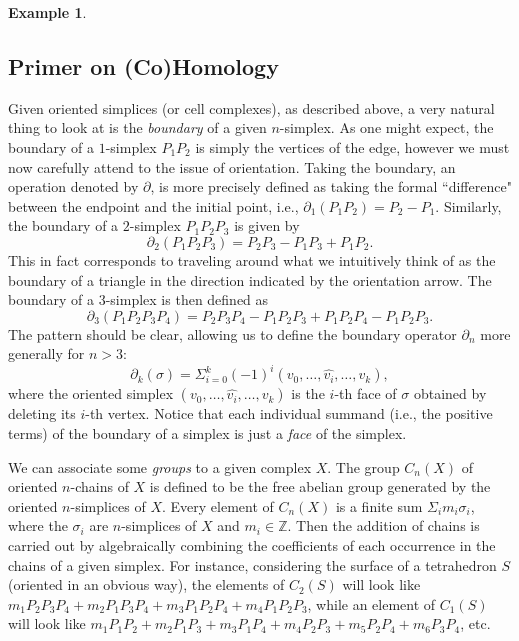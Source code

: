 \documentclass[a4paper]{book}
\theoremstyle{definition}
\newtheorem{example}{Example}[section]
\theoremstyle{definition}
\theoremstyle{definition}
\theoremstyle{theorem}
\theoremstyle{definition}
\begin{document}
\begin{example}
	\subsection{Primer on (Co)Homology}
	Given oriented simplices (or cell complexes), as described above, a very natural thing to look at is the \textit{boundary} of a given $n$-simplex. As one might expect, the boundary of a $1$-simplex $P_1P_2$ is simply the vertices of the edge, however we must now carefully attend to the issue of orientation. Taking the boundary, an operation denoted by $\partial$, is more precisely defined as taking the formal ``difference" between the endpoint and the initial point, i.e., $\partial_1(P_1P_2) = P_2 - P_1$. Similarly, the boundary of a $2$-simplex $P_1P_2P_3$ is given by 
	\begin{equation*}
	\partial_2(P_1P_2P_3) = P_2P_3 - P_1P_3 + P_1P_2.
	\end{equation*} 
	This in fact corresponds to traveling around what we intuitively think of as the boundary of a triangle in the direction indicated by the orientation arrow. The boundary of a $3$-simplex is then defined as 
	\begin{equation*}
	\partial_3(P_1P_2P_3P_4) = P_2P_3P_4 - P_1P_2P_3 + P_1P_2P_4 - P_1P_2P_3.
	\end{equation*}
	The pattern should be clear, allowing us to define the boundary operator $\partial_n$ more generally for $n > 3$: 
	\begin{equation}
	\partial_k(\sigma) = \Sigma_{i = 0}^k (-1)^i (v_0,\dots,\widehat{v_i},\dots,v_k), 
	\end{equation}
	where the oriented simplex $(v_0,\dots, \widehat{v_i}, \dots, v_k)$ is the $i$-th face of $\sigma$ obtained by deleting its $i$-th vertex. Notice that each individual summand (i.e., the positive terms) of the boundary of a simplex is just a \textit{face} of the simplex. \par  
	We can associate some \textit{groups} to a given complex $X$. The group $C_n(X)$ of oriented $n$-chains of $X$ is defined to be the free abelian group generated by the oriented $n$-simplices of $X$. Every element of $C_n(X)$ is a finite sum $\Sigma_i m_i \sigma_i$, where the $\sigma_i$ are $n$-simplices of $X$ and $m_i \in \mathbb{Z}$. Then the addition of chains is carried out by algebraically combining the coefficients of each occurrence in the chains of a given simplex. For instance, considering the surface of a tetrahedron $S$ (oriented in an obvious way), the elements of $C_2(S)$ will look like $m_1P_2P_3P_4 + m_2P_1P_3P_4 + m_3P_1P_2P_4 + m_4P_1P_2P_3$, while an element of $C_1(S)$ will look like $m_1P_1P_2 + m_2P_1P_3 + m_3P_1P_4 + m_4P_2P_3 + m_5P_2P_4 + m_6P_3P_4$, etc.\par 

\end{example}
\end{document}
